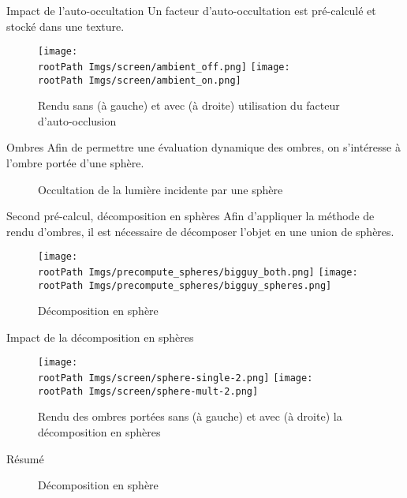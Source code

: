 \documentclass{beamer}
\newcommand*{\rootPath}{}
\begin{document}
\begin{frame}{Impact de l'auto-occultation}
	Un facteur d'auto-occultation est pré-calculé et stocké dans une texture.
	\begin{figure}[!ht]
		\centering
			\texttt{[image: \\rootPath Imgs/screen/ambient\_off.png]}
			\hspace{0.5cm}
			\texttt{[image: \\rootPath Imgs/screen/ambient\_on.png]}
		\caption{Rendu sans (à gauche) et avec (à droite) utilisation du facteur d'auto-occlusion}
	\end{figure}	
\end{frame}	

\begin{frame}{Ombres}
	Afin de permettre une évaluation dynamique des ombres, on s’intéresse à l'ombre portée d'une sphère.
	\begin{figure}[!ht]
		\centering
		
		\caption{Occultation de la lumière incidente par une sphère}
	\end{figure}	
\end{frame}	

\begin{frame}{Second pré-calcul, décomposition en sphères}
	Afin d'appliquer la méthode de rendu d'ombres, il est nécessaire de décomposer l'objet en une union de sphères.
	\begin{figure}[!ht]
		\centering
			\texttt{[image: \\rootPath Imgs/precompute\_spheres/bigguy\_both.png]}
			\hspace{0.5cm}
			\texttt{[image: \\rootPath Imgs/precompute\_spheres/bigguy\_spheres.png]}
		\caption{Décomposition en sphère}
	\end{figure}	
\end{frame}	

\begin{frame}{Impact de la décomposition en sphères}
	\begin{figure}
		\centering
			\texttt{[image: \\rootPath Imgs/screen/sphere-single-2.png]}
			\texttt{[image: \\rootPath Imgs/screen/sphere-mult-2.png]}
		\caption{Rendu des ombres portées sans (à gauche) et avec (à droite) la décomposition en sphères}
	\end{figure}
\end{frame}

\begin{frame}{Résumé}
	\begin{figure}[!ht]
		\centering
			
		\caption{Décomposition en sphère}
	\end{figure}	
\end{frame}	
\end{document}
